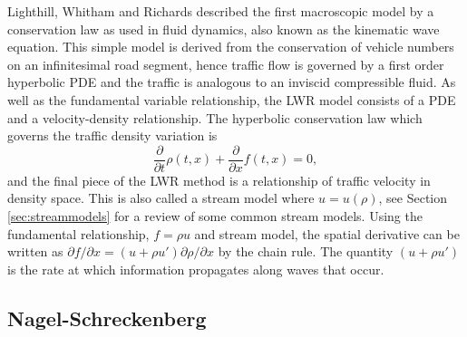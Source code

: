	Lighthill, Whitham \cite{Lighthill55} and Richards \cite{Richards56} described the first macroscopic model by a conservation law as used in fluid dynamics, also known as the kinematic wave equation. This simple model is derived from the conservation of vehicle numbers on an infinitesimal road segment, hence traffic flow is governed by a first order hyperbolic PDE and the traffic is analogous to an inviscid compressible fluid. As well as the fundamental variable relationship, the LWR model consists of a PDE and a velocity-density relationship. The hyperbolic conservation law which governs the traffic density variation is
	\begin{equation}
		\frac{\partial}{\partial t}\rho(t,x)+\frac{\partial}{\partial x}f(t,x)=0,
		\label{eq:LWR}
	\end{equation}
	and the final piece of the LWR method is a relationship of traffic velocity in density space. This is also called a stream model where $u=u(\rho)$, see Section \ref{sec:streammodels} for a review of some common stream models. Using the fundamental relationship, $f=\rho u$ and stream model, the spatial derivative can be written as $\partial f/\partial x=(u+\rho u')\partial\rho/\partial x$ by the chain rule. The quantity $(u+\rho u')$ is the rate at which information propagates along waves that occur.

\subsection{Nagel-Schreckenberg}
\label{sec:nagschreck}

